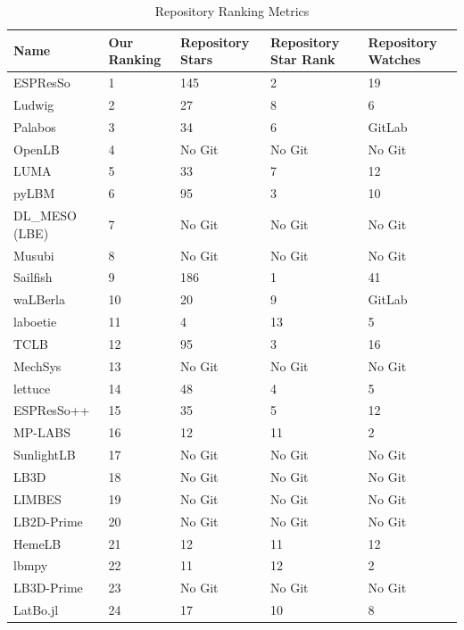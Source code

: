 \documentclass[final, 3p, times, authoryear]{elsarticle}
\begin{document}
\begin{table}
\begin{center}
	\begin{tabular}{ p{3.5cm}p{2.5cm}p{2cm}p{2cm}p{2cm} }
		\toprule
		Name & Our Ranking & Repository Stars & Repository Star Rank & Repository Watches \\
		\midrule
		ESPResSo & 1 & 145 & 2 & 19\\
		Ludwig & 2 & 27 & 8 & 6\\
		Palabos & 3 & 34 & 6 & GitLab\\
		OpenLB & 4 & No Git & No Git & No Git\\
		LUMA & 5 & 33 & 7 & 12\\
		pyLBM & 6 & 95 & 3 & 10\\
		DL\_MESO (LBE) & 7 & No Git & No Git & No Git \\
		Musubi & 8 & No Git & No Git & No Git \\
		Sailfish & 9 & 186 & 1 & 41\\
		waLBerla & 10 & 20 & 9 & GitLab\\
		laboetie & 11 & 4 & 13 & 5\\
		TCLB & 12 & 95 & 3 & 16\\
		MechSys & 13 & No Git & No Git & No Git\\
		lettuce & 14 & 48 & 4 & 5\\
		ESPResSo++ & 15 & 35 & 5 & 12\\
		MP-LABS & 16 & 12 & 11 & 2\\			
		SunlightLB & 17 & No Git & No Git & No Git\\
		LB3D & 18 & No Git & No Git & No Git\\			
		LIMBES & 19 & No Git & No Git & No Git\\
		LB2D-Prime & 20 & No Git & No Git & No Git\\		
		HemeLB & 21 & 12 & 11 & 12\\
		lbmpy & 22 &  11 & 12 & 2\\	
		LB3D-Prime & 23 & No Git & No Git & No Git\\	
		LatBo.jl & 24 & 17 & 10 & 8\\			
		\bottomrule
	\end{tabular}
	\caption{Repository Ranking Metrics} \label{repometrics}
\end{center}
\end{table}
\end{document}
